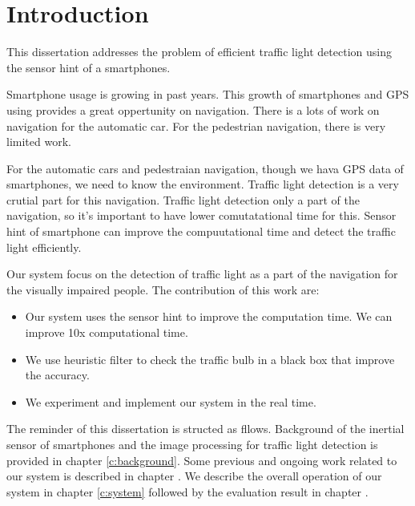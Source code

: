 \chapter{Introduction}

This dissertation addresses the problem of efficient traffic light detection using the sensor hint of a smartphones.

Smartphone usage is growing in past years.
This growth of smartphones and GPS using provides a great oppertunity on navigation.
There is a lots of work on navigation for the automatic car.
For the pedestrian navigation, there is very limited work.

For the automatic cars and pedestraian navigation, though we hava GPS data of smartphones, we need to know the environment.
Traffic light detection is a very crutial part for this navigation.
Traffic light detection only a part of the navigation, so it's important to have lower comutatational time for this.
Sensor hint of smartphone can improve the compuutational time and detect the traffic light efficiently.

Our system focus on the detection of traffic light as a part of the navigation for the visually impaired people.
The contribution of this work are:
\begin{itemize}
  
\item Our system uses the sensor hint to improve the computation time. We can improve 10x computational time.
\item We use heuristic filter to check the traffic bulb in a black box that improve the accuracy.
\item We experiment and implement our system in the real time.  

\end{itemize}

The reminder of this dissertation is structed as fllows.
Background of the inertial sensor of smartphones and the image processing for traffic light detection is provided in chapter \ref{c:background}.
Some previous and ongoing work related to our system is described in chapter .
We describe the overall operation of our system in chapter \ref{c:system} followed by the evaluation result in chapter .
